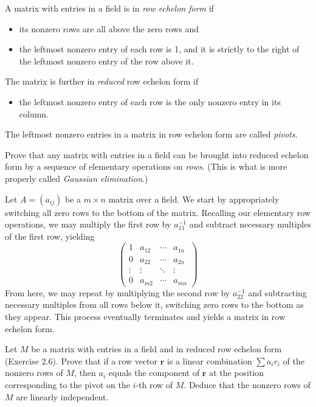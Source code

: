\documentclass[../../master.tex]{subfiles}
\begin{document}
\begin{problem}
    A matrix with entries in a field is in \textit{row echelon form} if
    \begin{itemize}
        \item its nonzero rows are all above the zero rows and
        \item the leftmost nonzero entry of each row is 1, and it is strictly to the right of the leftmost nonzero entry of the row above it.
    \end{itemize}
    The matrix is further in \textit{reduced} row echelon form if
    \begin{itemize}
        \item the leftmost nonzero entry of each row is the only nonzero entry in its column.
    \end{itemize}
    The leftmost nonzero entries in a matrix in row echelon form are called \textit{pivots}.

    Prove that any matrix with entries in a field can be brought into reduced echelon form by a sequence of elementary operations on \textit{rows}.
    (This is what is more properly called \textit{Gaussian elimination}.)
\end{problem}

\begin{solution}
    Let $A = (a_{ij})$ be a $m \times n$ matrix over a field.
    We start by appropriately switching all zero rows to the bottom of the matrix.
    Recalling our elementary row operations, we may multiply the first row by $a_{11}^{-1}$ and subtract necessary multiples of the first row, yielding
    \[
    \begin{pmatrix}
        1 & a_{12} & \cdots & a_{1n} \\
        0 & a_{22} & \cdots & a_{2n} \\
        \vdots & \vdots & \ddots & \vdots \\
        0 & a_{m2} & \cdots & a_{mn}
    \end{pmatrix}
    \]
    From here, we may repeat by multiplying the second row by $a_{22}^{-1}$ and subtracting necessary multiples from all rows below it, switching zero rows to the bottom as they appear.
    This process eventually terminates and yields a matrix in row echelon form.
\end{solution}

\begin{problem}
    Let $M$ be a matrix with entries in a field and in reduced row echelon form (Exercise 2.6).
    Prove that if a row vector $\bm{r}$ is a linear combination $\sum a_i r_i$ of the nonzero rows of $M$, then $a_i$ equals the component of $\bm{r}$ at the position corresponding to the pivot on the $i$-th row of $M$.
    Deduce that the nonzero rows of $M$ are linearly independent.
\end{problem}
\end{document}
